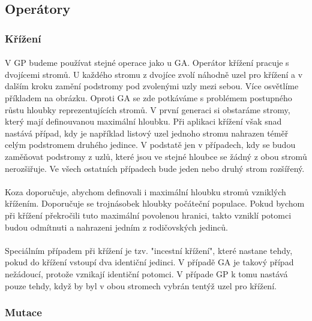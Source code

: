 \documentclass[bc,male,java,dept460]{diploma}		%
\begin{document}
\subsection{Operátory}

\subsubsection{Křížení}
\paragraph*{}
V GP budeme používat stejné operace jako u GA. Operátor křížení pracuje s dvojícemi stromů. U každého stromu z dvojíce zvolí náhodně uzel pro křížení a v dalším kroku zamění podstromy pod zvolenými uzly mezi sebou. Více osvětlíme příkladem na obrázku. Oproti GA se zde potkáváme s problémem postupného růstu hloubky reprezentujících stromů. V první generaci si obstaráme stromy, který mají definouvanou maximální hloubku. Při aplikaci křížení však snad nastává případ, kdy je například listový uzel jednoho stromu nahrazen téměř celým podstromem druhého jedince. V podstatě jen v případech, kdy se budou zaměňovat podstromy z uzlů, které jsou ve stejné hloubce se žádný z obou stromů nerozšiřuje. Ve všech ostatních případech bude jeden nebo druhý strom rozšířený.

\paragraph*{}
Koza doporučuje, abychom definovali i maximální hloubku stromů vzniklých křížením. Doporučuje se trojnásobek hloubky počáteční populace. Pokud bychom při křížení překročili tuto maximální povolenou hranici, takto vzniklí potomci budou odmítnuti a nahrazeni jedním z rodičovských jedinců.

\paragraph*{}
Speciálním případem při křížení je tzv. "incestní křížení", které nastane tehdy, pokud do křížení vstoupí dva identiční jedinci. V případě GA je takový případ nežádoucí, protože vznikají identiční potomci. V případe GP k tomu nastává pouze tehdy, když by byl v obou stromech vybrán tentýž uzel pro křížení.

\subsubsection{Mutace}
\end{document}
